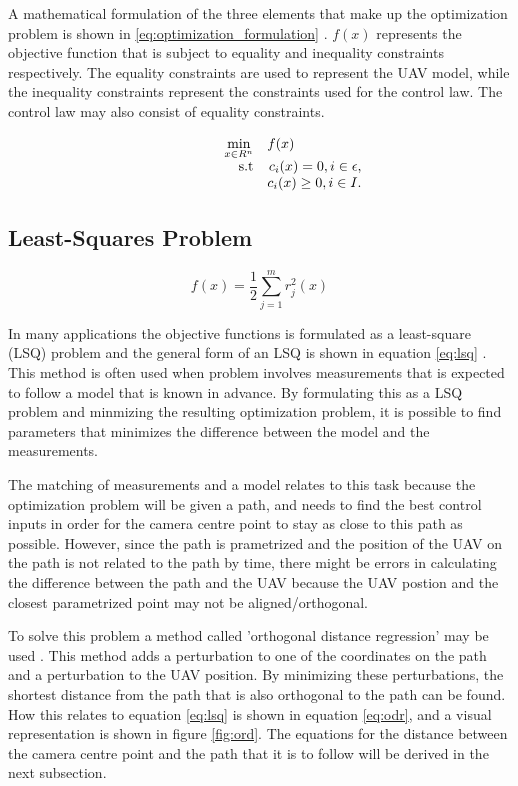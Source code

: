 A mathematical formulation of the three elements that make up the optimization problem is shown in \ref{eq:optimization_formulation} \cite{nocedalOPTIMIZATION}. $f(x)$ represents the objective function that is subject to equality and inequality constraints respectively. The equality constraints are used to represent the UAV model, while the inequality constraints represent the constraints used for the control law. The control law may also consist of equality constraints.

\begin{equation}
	\label{eq:optimization_formulation}
	\begin{array}{rrclcl}
		\displaystyle \min_{x \in R^n} & \multicolumn{3}{l}{f(x)} \\
		\textrm{s.t}
		& c_i(x) = 0, i \in \epsilon, \\
		& c_i(x) \geq 0, i \in I.
	\end{array}
\end{equation}

\subsection{Least-Squares Problem}

\begin{equation}
	\label{eq:lsq}
	f(x) = \frac{1}{2} \sum_{j=1}^m r_j^2(x)
\end{equation}

In many applications the objective functions is formulated as a least-square (LSQ) problem and the general form of an LSQ is shown in equation \ref{eq:lsq} \cite{nocedalOPTIMIZATION}. This method is often used when problem involves measurements that is expected to follow a model that is known in advance. By formulating this as a LSQ problem and minmizing the resulting optimization problem, it is possible to find parameters that minimizes the difference between the model and the measurements. 

The matching of measurements and a model relates to this task because the optimization problem will be given a path, and needs to find the best control inputs in order for the camera centre point to stay as close to this path as possible. However, since the path is prametrized and the position of the UAV on the path is not related to the path by time, there might be errors in calculating the difference between the path and the UAV because the UAV postion and the closest parametrized point may not be aligned/orthogonal. 

To solve this problem a method called 'orthogonal distance regression' may be used \cite{nocedalOPTIMIZATION}. This method adds a perturbation to one of the coordinates on the path and a perturbation to the UAV position. By minimizing these perturbations, the shortest distance from the path that is also orthogonal to the path can be found. How this relates to equation \ref{eq:lsq} is shown in equation \ref{eq:odr}, and a visual representation is shown in figure \ref{fig:ord}. The equations for the distance between the camera centre point and the path that it is to follow will be derived in the next subsection.

